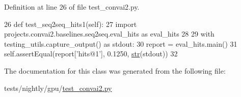 Definition at line 26 of file test\+\_\+convai2.\+py.


\begin{DoxyCode}
26     \textcolor{keyword}{def }test\_seq2seq\_hits1(self):
27         \textcolor{keyword}{import} projects.convai2.baselines.seq2seq.eval\_hits \textcolor{keyword}{as} eval\_hits
28 
29         with testing\_utils.capture\_output() \textcolor{keyword}{as} stdout:
30             report = eval\_hits.main()
31         self.assertEqual(report[\textcolor{stringliteral}{'hits@1'}], 0.1250, \hyperlink{namespacegenerate__task__READMEs_a5b88452ffb87b78c8c85ececebafc09f}{str}(stdout))
32 
\end{DoxyCode}


The documentation for this class was generated from the following file\+:\begin{DoxyCompactItemize}
\item 
tests/nightly/gpu/\hyperlink{test__convai2_8py}{test\+\_\+convai2.\+py}\end{DoxyCompactItemize}
